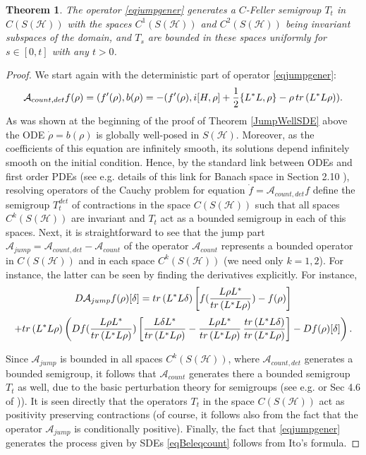 \documentclass[10pt,a4paper]{amsart}
\def\AC{\mathcal{A}}
\def\HC{\mathcal{H}}
\def\tr{\rm{tr}}
\def\de{\delta}
\newtheorem{theorem}{Theorem}[section]
\begin{document}
\begin{theorem}
\label{JumpWellPDE}
The operator  \eqref{eqjumpgener} generates a
$C$-Feller semigroup $T_t$ in $C(S(\HC))$ with the spaces
 $C^1(S(\HC))$ and $C^2(S(\HC))$ being invariant subspaces of the domain,
 and $T_s$ are bounded in these spaces
 uniformly for $s\in [0,t]$ with any $t>0$.
\end{theorem}


\begin{proof}
We start again with the deterministic part of
operator \eqref{eqjumpgener}:
\[
\AC_{count, det}f(\rho)=(f'(\rho), b(\rho)=-(f'(\rho), i[H, \rho]
+ \frac12 \{L^*L,\rho\}-\rho \, {\tr}\, (L^*L\rho)).
\]
As was shown at the beginning of the proof of Theorem \ref{JumpWellSDE} above the ODE
$\dot \rho=b(\rho)$ is globally well-posed in $S(\HC)$. Moreover, as the coefficients
of this equation are infinitely smooth, its solutions
depend infinitely smooth on the initial condition. Hence, by the standard link between ODEs and
first order PDEs (see e.g. details of this link for Banach space in Section 2.10 \cite{Kolbook19}),
resolving operators of the Cauchy problem for equation $\dot f=\AC_{count,det}f$ define the semigroup
$T_t^{det}$ of contractions in the space $C(S(\HC))$ such that all spaces $C^k(S(\HC))$ are invariant and
$T_t$ act as a bounded semigroup in each of this spaces.  Next, it is straightforward to see that
the jump part $\AC_{jump}=\AC_{count, det}-\AC_{count}$ of the operator $\AC_{count}$ represents a
bounded operator in $C(S(\HC))$ and in each space $C^k(S(\HC))$ (we need only $k=1,2$). For instance,
the latter can be seen by finding the derivatives explicitly. For instance,
\[
D\AC_{jump}f(\rho)[\de]
= {\tr}\, (L^*L\de)\left[f(\frac{L\rho L^*}{{\tr}\, (L^*L\rho)})-f(\rho)\right]
\]
\[
+{\tr}\, (L^*L\rho)\left(Df(\frac{L\rho L^*}{{\tr}\, (L^*L\rho)})
\left[ \frac{L\de L^*}{{\tr}\, (L^*L\rho)}-\frac{L\rho L^*}{{\tr}\, (L^*L\rho)}\,
\frac{{\tr}\, (L^*L\de)}{{\tr}\, (L^*L\rho)} \right]
-Df(\rho)[\de]\right).
\]

Since $\AC_{jump}$ is bounded in all spaces $C^k(S(\HC))$, where $\AC_{count,det}$ generates a bounded semigroup,
it follows that $\AC_{count}$ generates there a bounded semigroup $T_t$ as well, due to the basic perturbation theory for
semigroups (see e.g. \cite{ReedSimon} or Sec 4.6 of \cite{Kolbook19})). It is seen directly that the operators $T_t$
in the space $C(S(\HC))$ act as positivity preserving contractions (of course, it follows also from
the fact that the operator $\AC_{jump}$ is conditionally positive).
Finally, the fact that  \eqref{eqjumpgener} generates the process given
by SDEs  \eqref{eqBeleqcount} follows from Ito's formula.
\end{proof}
\end{document}
